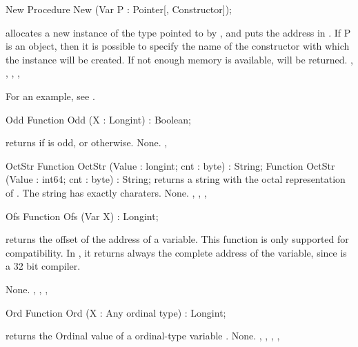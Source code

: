\begin{procedure}{New}
\Declaration
Procedure New (Var P : Pointer[, Constructor]);

\Description
{} allocates a new instance of the type pointed to by , and
puts the address in .
If P is an object, then it is possible to
specify the name of the constructor with which the instance will be created.
\Errors
If not enough memory is available,  will be returned.
\SeeAlso
{}, , , ,
\end{procedure}
For an example, see .
\begin{function}{Odd}
\Declaration
Function Odd (X : Longint) : Boolean;

\Description
{} returns  if  is odd, or  otherwise.
\Errors
None.
\SeeAlso
{}, 
\end{function}


\begin{function}{OctStr}
\Declaration
Function OctStr (Value : longint; cnt : byte) : String;
Function OctStr (Value : int64; cnt : byte) : String;
\Description
{} returns a string with the octal representation
of . The string has exactly  charaters.
\Errors
None.
\SeeAlso
{}, , , 
\end{function}


\begin{function}{Ofs}
\Declaration
Function Ofs (Var X) : Longint;

\Description
{} returns the offset of the address of a variable.
This function is only supported for compatibility. In \fpc, it
returns always the complete address of the variable, since \fpc is a 32 bit
compiler.

\Errors
None.
\SeeAlso
{}, , , 
\end{function}


\begin{function}{Ord}
\Declaration
Function Ord (X : Any ordinal type) : Longint;

\Description
{} returns the Ordinal value of a ordinal-type variable .
\Errors
None.
\SeeAlso
{}, , , , 
\end{function}

